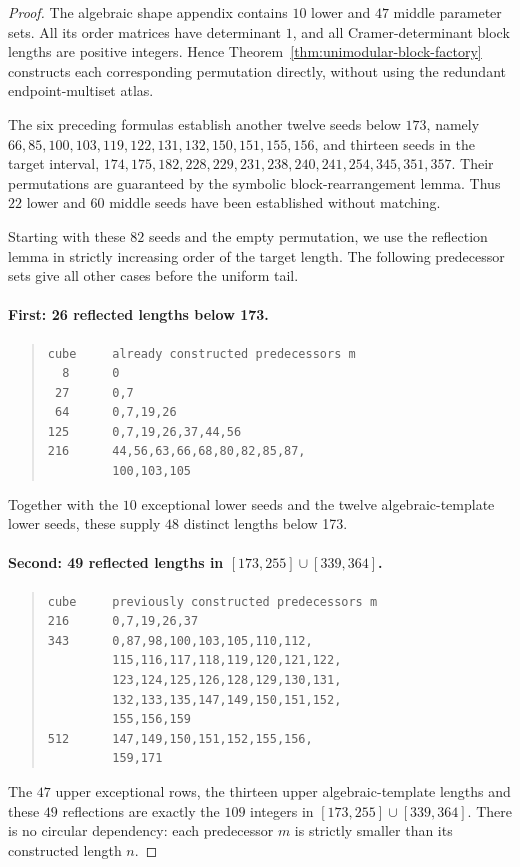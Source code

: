 \documentclass[10pt]{article}
\begin{document}
\begin{proof}
The algebraic shape appendix contains
$10$ lower and $47$ middle parameter sets.
All its order matrices have determinant $1$,
and all Cramer-determinant block lengths
are positive integers. Hence
Theorem~\ref{thm:unimodular-block-factory}
constructs each corresponding permutation
directly, without using the redundant
endpoint-multiset atlas.

The six preceding formulas establish
another twelve seeds below $173$, namely
$66,85,100,103,119,122,131,132,150,151,155,156$,
and thirteen seeds in the target interval,
$174,175,182,228,229,231,238,240,241,254,345,351,357$.
Their permutations are guaranteed by
the symbolic block-rearrangement lemma.
Thus $22$ lower and $60$ middle seeds
have been established without matching.

Starting with these $82$ seeds and
the empty permutation, we use the
reflection lemma in strictly increasing
order of the target length.
The following predecessor sets give all
other cases before the uniform tail.

\paragraph{First: 26 reflected lengths below 173.}
\begin{quote}
\footnotesize
\begin{verbatim}
cube     already constructed predecessors m
  8      0
 27      0,7
 64      0,7,19,26
125      0,7,19,26,37,44,56
216      44,56,63,66,68,80,82,85,87,
         100,103,105
\end{verbatim}
\end{quote}
Together with the $10$ exceptional lower seeds
and the twelve algebraic-template lower seeds,
these supply $48$ distinct lengths below 173.

\paragraph{Second: 49 reflected lengths in
$[173,255]\cup[339,364]$.}
\begin{quote}
\footnotesize
\begin{verbatim}
cube     previously constructed predecessors m
216      0,7,19,26,37
343      0,87,98,100,103,105,110,112,
         115,116,117,118,119,120,121,122,
         123,124,125,126,128,129,130,131,
         132,133,135,147,149,150,151,152,
         155,156,159
512      147,149,150,151,152,155,156,
         159,171
\end{verbatim}
\end{quote}
The $47$ upper exceptional rows, the thirteen
upper algebraic-template lengths and these $49$
reflections are exactly the $109$ integers
in $[173,255]\cup[339,364]$.
There is no circular dependency:
each predecessor $m$ is strictly smaller
than its constructed length $n$.


\end{proof}
\end{document}
